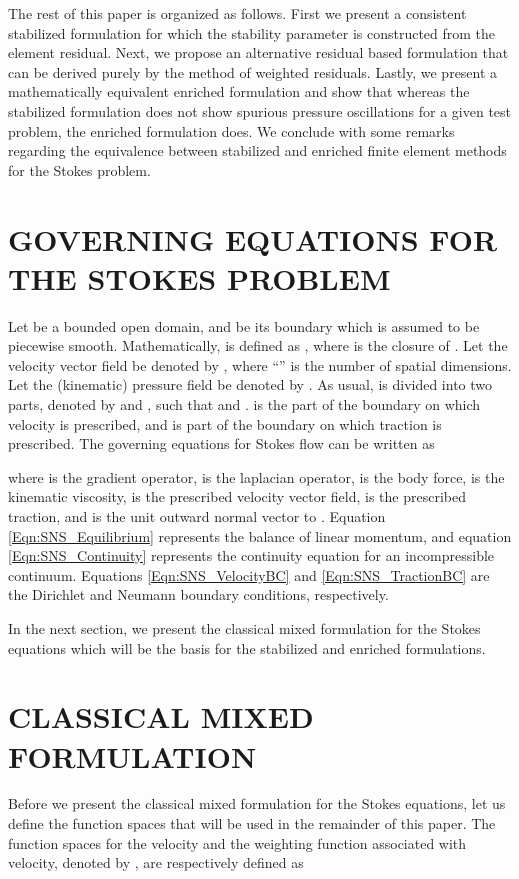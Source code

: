 \documentclass[11pt]{amsart}
\begin{document}
The rest of this paper is organized as follows.  First we present a consistent stabilized formulation for which the stability parameter is constructed from the element residual. Next, we propose an alternative residual based formulation that can be derived purely by the method of weighted residuals.  Lastly, we present a mathematically equivalent enriched formulation and show that whereas the stabilized formulation does not show spurious pressure oscillations for a given test problem, the enriched formulation does.  We conclude with some remarks regarding the equivalence between stabilized and enriched finite element methods for the Stokes problem.


 \section{GOVERNING EQUATIONS FOR THE STOKES PROBLEM}
  Let  be a bounded open domain, and  be its boundary 
  which is assumed to be piecewise smooth. Mathematically,  
  is defined as , where  
  is the closure of . Let the velocity vector field be denoted by 
  , where ``'' 
  is the number of spatial dimensions. Let the (kinematic) pressure field 
  be denoted by . 
As usual,  is divided into two parts, denoted by 
   and , such 
  that  
  and .   is the part of the boundary 
  on which velocity is prescribed, and  
  is part of the boundary on which traction is prescribed. 
  The governing equations for Stokes flow can be written as 

where  is the gradient operator,  is the laplacian operator,  is the body force, 
   is the kinematic viscosity,  is the 
  prescribed velocity vector field,  is the 
  prescribed traction, and  is the unit outward normal vector 
  to . Equation \eqref{Eqn:SNS_Equilibrium} represents the balance of 
  linear momentum, and equation \eqref{Eqn:SNS_Continuity} represents the continuity 
  equation for an incompressible continuum. Equations \eqref{Eqn:SNS_VelocityBC} 
  and \eqref{Eqn:SNS_TractionBC} are the Dirichlet and Neumann boundary 
  conditions, respectively. 
  


  In the next section, we present the classical mixed formulation for 
  the Stokes equations which will be the basis for the stabilized and enriched formulations. 
   \section{CLASSICAL MIXED FORMULATION}
Before we present the classical mixed formulation for the Stokes equations, 
let us define the function spaces that will be used in the remainder of this paper. 
The function spaces for the velocity  and the weighting 
function associated with velocity, denoted by , are 
respectively defined as
\end{document}
